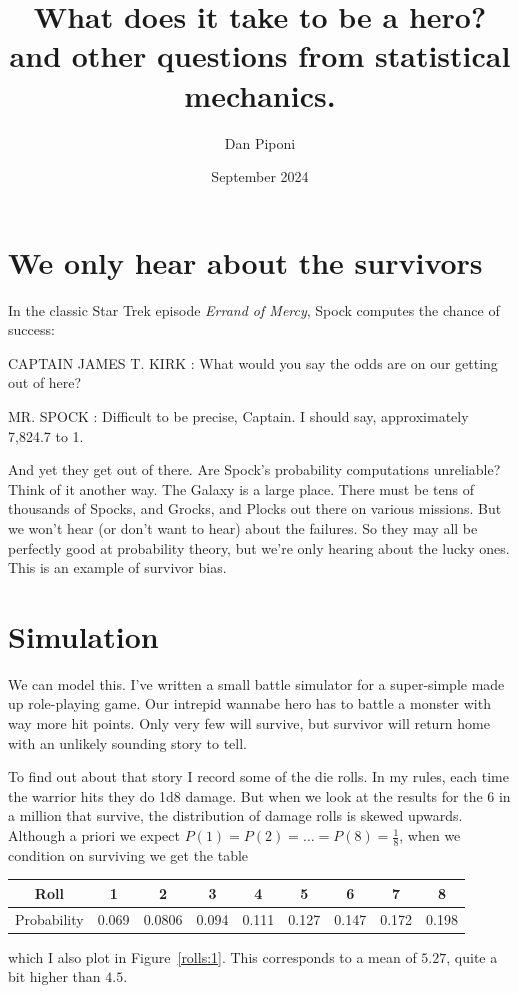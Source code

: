 \documentclass[12pt]{article}
\title{What does it take to be a hero? and other questions from statistical mechanics.}
\author{Dan Piponi}
\date{September 2024}
\begin{document}
\maketitle

\section{We only hear about the survivors}
In the classic Star Trek episode \emph{Errand of Mercy}, Spock computes the chance of success:
\begin{displayquote}
CAPTAIN JAMES T. KIRK : What would you say the odds are on our getting out of here?

MR. SPOCK : Difficult to be precise, Captain. I should say, approximately 7,824.7 to 1.
\end{displayquote}
And yet they get out of there. Are Spock's probability computations unreliable?
Think of it another way. The Galaxy is a large place.
There must be tens of thousands of Spocks, and Grocks, and Plocks out there on various missions.
But we won't hear (or don't want to hear) about the failures.
So they may all be perfectly good at probability theory, but we're only hearing about the lucky ones.
This is an example of survivor bias.

\section{Simulation}
We can model this.
I've written a small battle simulator for a super-simple made up role-playing game.
Our intrepid wannabe hero has to battle a monster with way more hit points.
Only very few will survive, but survivor will return home with an unlikely sounding story to tell.

To find out about that story I record some of the die rolls.
In my rules, each time the warrior hits they do 1d8 damage.
But when we look at the results for the 6 in a million that survive, the distribution of damage rolls is skewed upwards.
Although a priori we expect $P(1)=P(2)=\ldots=P(8)=\frac{1}{8}$, when we condition on surviving we
get the table
\begin{center}
\begin{tabular}{|c|c|c|c|c|c|c|c|c|}
\hline
Roll & 1 & 2 & 3 & 4 & 5 & 6 & 7 & 8\\
\hline
Probability & 0.069 & 0.0806 & 0.094 & 0.111 & 0.127 & 0.147 & 0.172 & 0.198\\
\hline
\end{tabular}
\end{center}
which I also plot in Figure~\ref{rolls:1}.
This corresponds to a mean of $5.27$, quite a bit higher than $4.5$.
\end{document}
